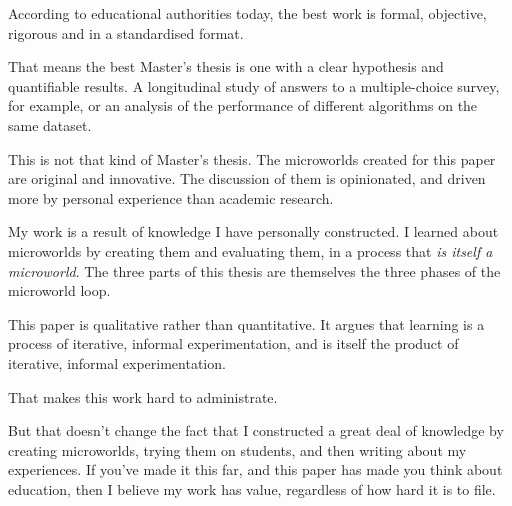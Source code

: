 According to educational authorities today, the best work is formal, objective, rigorous and in a standardised format. 

That means the best Master's thesis is one with a clear hypothesis and quantifiable results. A longitudinal study of answers to a multiple-choice survey, for example, or an analysis of the performance of different algorithms on the same dataset.

This is not that kind of Master's thesis. The microworlds created for this paper are original and innovative. The discussion of them is opinionated, and driven more by personal experience than academic research. 

My work is a result of knowledge I have personally constructed. I learned about microworlds by creating them and evaluating them, in a process that \textit{is itself a microworld}. The three parts of this thesis are themselves the three phases of the microworld loop.

This paper is qualitative rather than quantitative. It argues that learning is a process of iterative, informal experimentation, and is itself the product of iterative, informal experimentation. 

That makes this work hard to administrate.

But that doesn't change the fact that I constructed a great deal of knowledge by creating microworlds, trying them on students, and then writing about my experiences. If you've made it this far, and this paper has made you think about education, then I believe my work has value, regardless of how hard it is to file.
